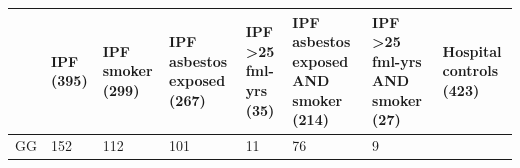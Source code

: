 \begin{longtable}[]{@{}llllllll@{}}
\toprule
\begin{minipage}[b]{0.05\columnwidth}\raggedright
\strut
\end{minipage} & \begin{minipage}[b]{0.05\columnwidth}\raggedright
IPF (395)\strut
\end{minipage} & \begin{minipage}[b]{0.09\columnwidth}\raggedright
IPF smoker (299)\strut
\end{minipage} & \begin{minipage}[b]{0.11\columnwidth}\raggedright
IPF asbestos exposed (267)\strut
\end{minipage} & \begin{minipage}[b]{0.11\columnwidth}\raggedright
IPF \textgreater25 fml-yrs (35)\strut
\end{minipage} & \begin{minipage}[b]{0.15\columnwidth}\raggedright
IPF asbestos exposed AND smoker (214)\strut
\end{minipage} & \begin{minipage}[b]{0.14\columnwidth}\raggedright
IPF \textgreater25 fml-yrs AND smoker (27)\strut
\end{minipage} & \begin{minipage}[b]{0.08\columnwidth}\raggedright
Hospital controls (423)\strut
\end{minipage}\tabularnewline
\midrule
\endhead
\begin{minipage}[t]{0.05\columnwidth}\raggedright
GG\strut
\end{minipage} & \begin{minipage}[t]{0.05\columnwidth}\raggedright
152\strut
\end{minipage} & \begin{minipage}[t]{0.09\columnwidth}\raggedright
112\strut
\end{minipage} & \begin{minipage}[t]{0.11\columnwidth}\raggedright
101\strut
\end{minipage} & \begin{minipage}[t]{0.11\columnwidth}\raggedright
11\strut
\end{minipage} & \begin{minipage}[t]{0.15\columnwidth}\raggedright
76\strut
\end{minipage} & \begin{minipage}[t]{0.14\columnwidth}\raggedright
9\strut
\end{minipage} & \begin{minipage}[t]{0.08\columnwidth}\raggedright

\end{minipage}
\end{longtable}
